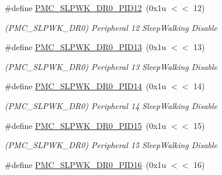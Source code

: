 \begin{DoxyCompactItemize}
\mbox{\label{group__SAMV71__PMC_ga5190bf95bc37a6b05d1a669664b3d4fd}} 
\#define \mbox{\hyperlink{group__SAMV71__PMC_ga5190bf95bc37a6b05d1a669664b3d4fd}{P\+M\+C\+\_\+\+S\+L\+P\+W\+K\+\_\+\+D\+R0\+\_\+\+P\+I\+D12}}~(0x1u $<$$<$ 12)
\begin{DoxyCompactList}\small\item\em (P\+M\+C\+\_\+\+S\+L\+P\+W\+K\+\_\+\+D\+R0) Peripheral 12 Sleep\+Walking Disable \end{DoxyCompactList}\item 
\mbox{\label{group__SAMV71__PMC_ga5a77c1b7943aa2544f0543c6e9a39e28}} 
\#define \mbox{\hyperlink{group__SAMV71__PMC_ga5a77c1b7943aa2544f0543c6e9a39e28}{P\+M\+C\+\_\+\+S\+L\+P\+W\+K\+\_\+\+D\+R0\+\_\+\+P\+I\+D13}}~(0x1u $<$$<$ 13)
\begin{DoxyCompactList}\small\item\em (P\+M\+C\+\_\+\+S\+L\+P\+W\+K\+\_\+\+D\+R0) Peripheral 13 Sleep\+Walking Disable \end{DoxyCompactList}\item 
\mbox{\label{group__SAMV71__PMC_ga2fda27a3f63352ad94ffa139e673ce3b}} 
\#define \mbox{\hyperlink{group__SAMV71__PMC_ga2fda27a3f63352ad94ffa139e673ce3b}{P\+M\+C\+\_\+\+S\+L\+P\+W\+K\+\_\+\+D\+R0\+\_\+\+P\+I\+D14}}~(0x1u $<$$<$ 14)
\begin{DoxyCompactList}\small\item\em (P\+M\+C\+\_\+\+S\+L\+P\+W\+K\+\_\+\+D\+R0) Peripheral 14 Sleep\+Walking Disable \end{DoxyCompactList}\item 
\mbox{\label{group__SAMV71__PMC_gaa01d43dceb9334f103ded15534d67f73}} 
\#define \mbox{\hyperlink{group__SAMV71__PMC_gaa01d43dceb9334f103ded15534d67f73}{P\+M\+C\+\_\+\+S\+L\+P\+W\+K\+\_\+\+D\+R0\+\_\+\+P\+I\+D15}}~(0x1u $<$$<$ 15)
\begin{DoxyCompactList}\small\item\em (P\+M\+C\+\_\+\+S\+L\+P\+W\+K\+\_\+\+D\+R0) Peripheral 15 Sleep\+Walking Disable \end{DoxyCompactList}\item 
\mbox{\label{group__SAMV71__PMC_ga6b9a8c51ed8298f8ba49da09ab55980d}} 
\#define \mbox{\hyperlink{group__SAMV71__PMC_ga6b9a8c51ed8298f8ba49da09ab55980d}{P\+M\+C\+\_\+\+S\+L\+P\+W\+K\+\_\+\+D\+R0\+\_\+\+P\+I\+D16}}~(0x1u $<$$<$ 16)
$$
\end{DoxyCompactItemize}

